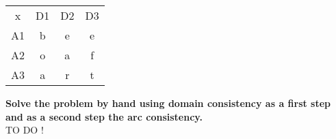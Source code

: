 \documentclass[10pt,a4paper]{article}
\begin{document}
\begin{center}
	\begin{tabular}{ c c c c}
	x & D1 & D2 & D3 \\
	A1 & b & e & e \\ 
	A2 & o & a & f \\  
	A3 & a & r & t    
	\end{tabular}
\end{center}


\textbf{Solve the problem by hand using domain consistency as a first step and as a second step the arc consistency.} \\

TO DO !
\end{document}
